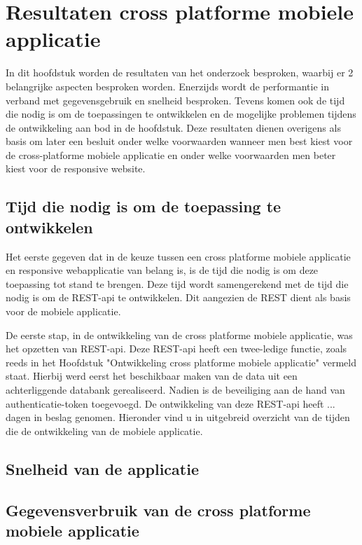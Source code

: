 \chapter{Resultaten cross platforme mobiele applicatie}
\label{ch:resultatencrossplatformapp}
In dit hoofdstuk worden de resultaten van het onderzoek besproken, waarbij er 2 belangrijke
aspecten besproken worden.
Enerzijds wordt de performantie in verband met gegevensgebruik en  snelheid besproken.
Tevens komen ook de tijd die nodig is om de toepassingen te ontwikkelen en de mogelijke
problemen tijdens de ontwikkeling aan bod in de hoofdstuk.
Deze resultaten dienen overigens als basis om later een besluit onder welke
voorwaarden wanneer men best kiest voor de
cross-platforme mobiele applicatie en onder welke voorwaarden men beter kiest voor de responsive website.

\section{Tijd die nodig is om de toepassing te ontwikkelen}
Het eerste gegeven dat in de keuze tussen een cross platforme mobiele
applicatie en responsive webapplicatie van belang is,
is de tijd die nodig is om deze toepassing tot stand te brengen.
Deze tijd wordt samengerekend met de tijd die nodig is om de
REST-api te ontwikkelen. Dit aangezien de REST dient als basis voor de mobiele applicatie.

De eerste stap, in de ontwikkeling van de cross platforme mobiele applicatie, was het opzetten van REST-api.
Deze REST-api heeft een twee-ledige functie, zoals reeds in het Hoofdstuk "Ontwikkeling cross platforme mobiele applicatie" vermeld staat.
Hierbij werd eerst het beschikbaar maken van de data uit een achterliggende databank gerealiseerd. Nadien is de beveiliging aan de hand
van authenticatie-token toegevoegd. De ontwikkeling van deze REST-api heeft ... dagen in beslag genomen. Hieronder vind u in uitgebreid
overzicht van de tijden die de ontwikkeling van de mobiele applicatie.




\section{Snelheid van de applicatie}


\section{Gegevensverbruik van de cross platforme mobiele applicatie}

